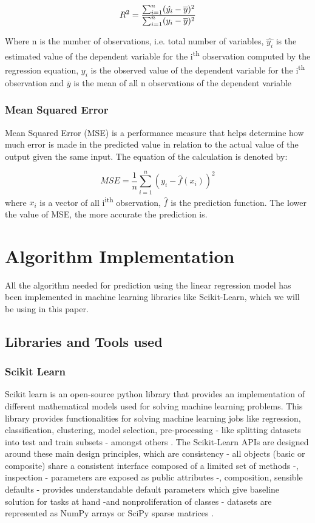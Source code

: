 \documentclass[conference]{IEEEtran}
\begin{document}
	\begin{equation}
		R\textsuperscript{2} = \label{three}\frac{\sum_{i=1}^{n}(\hat{y_i}-\overline{y})^2}{\sum_{i=1}^{n}(y_i-\overline{y})^2}
	\end{equation}
	
	Where n is the number of observations, i.e. total number of variables, $\hat{y_i}$ is the estimated value of the dependent variable for the i\textsuperscript{th} observation computed by the regression equation, $y_i$ is the observed value of the dependent variable for the i\textsuperscript{th} observation and $\overline{y}$ is the mean of all n observations of the dependent variable \cite{DAE79009}

\subsubsection{Mean Squared Error}
Mean Squared Error (MSE) is a performance measure that helps determine how much error is made in the predicted value in relation to the actual value of the output given the same input. The equation of the calculation is denoted by:

	\begin{equation}
		MSE = \label{four}\frac{1}{n}\sum_{i=1}^{n}(y_i-\hat{f}(x_i))^2
	\end{equation}
	where $x_i$ is a vector of all i\textsuperscript{ith} observation, $\hat{f}$ is the prediction function. The lower the value of MSE, the more accurate the prediction is.
\section{Algorithm Implementation}
All the algorithm needed for prediction using the linear regression model has been implemented in machine learning libraries like Scikit-Learn, which we will be using in this paper.
\subsection{Libraries and Tools used}
\subsubsection{Scikit Learn}
Scikit learn is an open-source python library that provides an implementation of different mathematical models used for solving machine learning problems. This library provides functionalities for solving machine learning jobs like regression, classification, clustering, model selection, pre-processing - like splitting datasets into test and train subsets - amongst others \cite{scikit_learn}. The Scikit-Learn APIs are designed around these main design principles, which are consistency - all objects (basic or composite) share a consistent interface composed of a limited set of methods -, inspection - parameters are exposed as public attributes -, composition, sensible defaults - provides understandable default parameters which give baseline solution for tasks at hand -and nonproliferation of classes - datasets are represented as NumPy arrays or SciPy sparse matrices \cite{sklearn_api}.
\end{document}
